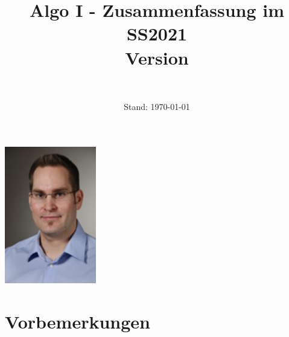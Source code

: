\documentclass{article}
\title{Algo I - Zusammenfassung im SS2021\\[\subtitlelinesep]%
    \smaller[\subtitlerelsize]{}Version \version}
\author{\ushort\\\myName}
\date{Stand: \today}
\begin{document}
\maketitle

\vspace{2cm}

\begin{center}
    \includegraphics[width=0.3\textwidth]{./data/dachsbacher_klein.jpg}
\end{center}

\newpage

\tableofcontents
\newpage

% 

\section{Vorbemerkungen}

\newpage


\newpage


\newpage


\newpage


\newpage


\newpage


\newpage

\printindex
\newpage
\lstlistoflistings
\newpage
\listoffigures
\end{document}
